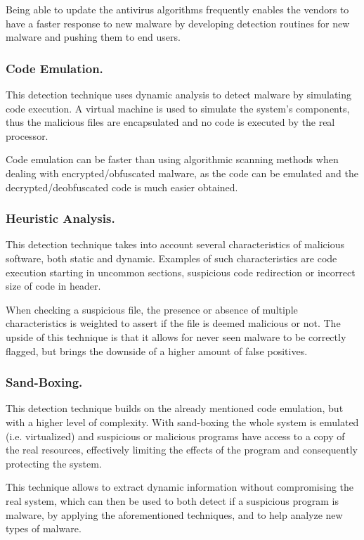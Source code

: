 \documentclass{llncs}
\begin{document}
Being able to update the antivirus algorithms frequently enables the vendors to have a faster response to new malware by developing detection routines for new malware and pushing them to end users.

\subsubsection{Code Emulation.} This detection technique uses dynamic analysis to detect malware by simulating code execution. A virtual machine is used to simulate the system's components, thus the malicious files are encapsulated and no code is executed by the real processor.

Code emulation can be faster than using algorithmic scanning methods when dealing with encrypted/obfuscated malware, as the code can be emulated and the decrypted/deobfuscated code is much easier obtained.

\subsubsection{Heuristic Analysis.} This detection technique takes into account several characteristics of malicious software, both static and dynamic. Examples of such characteristics are code execution starting in uncommon sections, suspicious code redirection or incorrect size of code in header.

When checking a suspicious file, the presence or absence of multiple characteristics is weighted to assert if the file is deemed malicious or not. The upside of this technique is that it allows for never seen malware to be correctly flagged, but brings the downside of a higher amount of false positives.

\subsubsection{Sand-Boxing.} This detection technique builds on the already mentioned code emulation, but with a higher level of complexity. With sand-boxing the whole system is emulated (i.e. virtualized) and suspicious or malicious programs have access to a copy of the real resources, effectively limiting the effects of the program and consequently protecting the system.

This technique allows to extract dynamic information without compromising the real system, which can then be used to both detect if a suspicious program is malware, by applying the aforementioned techniques, and to help analyze new types of malware.
\end{document}
